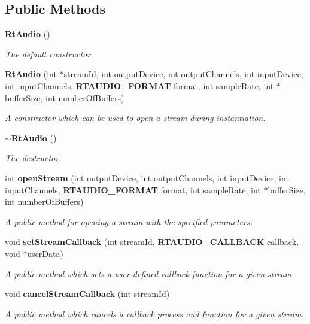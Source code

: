 \subsection*{Public Methods}
\begin{CompactItemize}
\item 
{\bf Rt\-Audio} ()
\begin{CompactList}\small\item\em The default constructor.\item\end{CompactList}\item 
{\bf Rt\-Audio} (int $\ast$stream\-Id, int output\-Device, int output\-Channels, int input\-Device, int input\-Channels, {\bf RTAUDIO\_\-FORMAT} format, int sample\-Rate, int $\ast$buffer\-Size, int number\-Of\-Buffers)
\begin{CompactList}\small\item\em A constructor which can be used to open a stream during instantiation.\item\end{CompactList}\item 
{\bf $\sim$Rt\-Audio} ()
\begin{CompactList}\small\item\em The destructor.\item\end{CompactList}\item 
int {\bf open\-Stream} (int output\-Device, int output\-Channels, int input\-Device, int input\-Channels, {\bf RTAUDIO\_\-FORMAT} format, int sample\-Rate, int $\ast$buffer\-Size, int number\-Of\-Buffers)
\begin{CompactList}\small\item\em A public method for opening a stream with the specified parameters.\item\end{CompactList}\item 
void {\bf set\-Stream\-Callback} (int stream\-Id, {\bf RTAUDIO\_\-CALLBACK} callback, void $\ast$user\-Data)
\begin{CompactList}\small\item\em A public method which sets a user-defined callback function for a given stream.\item\end{CompactList}\item 
void {\bf cancel\-Stream\-Callback} (int stream\-Id)
\begin{CompactList}\small\item\em A public method which cancels a callback process and function for a given stream.\item\end{CompactList}\item 

\end{CompactItemize}
